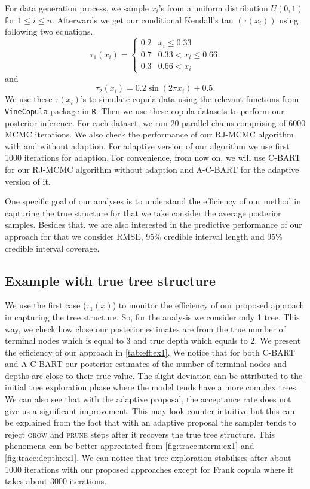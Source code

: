 \documentclass{amsart}
\begin{document}
For data generation process, we sample $x_i$'s from a uniform distribution $U(0,1)$ for $1\le i\le n$. Afterwards we get our conditional Kendall's tau $(\tau(x_i))$ using following two equations.
\begin{equation}\label{eq:tree:tau}
	\tau_1(x_i) = \begin{cases}
		0.2 & x_i \le 0.33\\
		0.7 & 0.33 < x_i \le 0.66\\
		0.3 & 0.66 < x_i
	\end{cases}
\end{equation}
and
\begin{equation}\label{eq:sin:tau}
	\tau_2(x_i) = 0.2\sin(2\pi x_i) + 0.5.
\end{equation}
We use these $\tau(x_i)$'s to simulate copula data using the relevant functions from \texttt{VineCopula} package in \texttt{R}. Then we use these copula datasets to perform our posterior inference. For each dataset, we run 20 parallel chains comprising of 6000 MCMC iterations. We also check the performance of our RJ-MCMC algorithm with and without adaption. For adaptive version of our algorithm we use first 1000 iterations for adaption. For convenience, from now on, we will use C-BART for our RJ-MCMC algorithm without adaption and A-C-BART for the adaptive version of it.

One specific goal of our analyses is to understand the efficiency of our method in capturing the true structure for that we take consider the average posterior samples. Besides that. we are also interested in the predictive performance of our approach for that we consider RMSE, 95\% credible interval length and 95\% credible interval coverage. 

\subsection{Example with true tree structure} 

We use the first case ($\tau_1(x)$) to monitor the efficiency of our proposed approach in capturing the tree structure. So, for the analysis we consider only 1 tree. This way, we check how close our posterior estimates are from the true number of terminal nodes which is equal to 3 and true depth which equals to 2. We present the efficiency of our approach in \cref{tab:eff:ex1}. We notice that for both C-BART and A-C-BART our posterior estimates of the number of terminal nodes and depths are close to their true value. The slight deviation can be attributed to the initial tree exploration phase where the model tends have a more complex trees. We can also see that with the adaptive proposal, the acceptance rate does not give us a significant improvement. This may look counter intuitive but this can be explained from the fact that with an adaptive proposal the sampler tends to reject \textsc{grow} and \textsc{prune} steps after it recovers the true tree structure. This phenomena can be better appreciated from \cref{fig:trace:nterm:ex1} and \cref{fig:trace:depth:ex1}. We can notice that tree exploration stabilises after about 1000 iterations with our proposed approaches except for Frank copula where it takes about 3000 iterations. 
\end{document}
